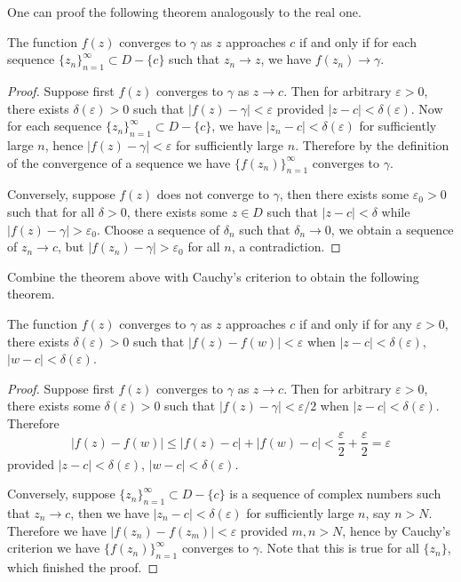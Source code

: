 One can proof the following theorem analogously to the real one.
\begin{theorem}
The function $f(z)$ converges to $\gamma$ as $z$ approaches $c$ if and only if for each sequence $\{z_n\}_{n=1}^\infty\subset D-\{c\}$ such that $z_n\to z$, we have $f(z_n)\to \gamma$.
\end{theorem}
\begin{proof}
Suppose first $f(z)$ converges to $\gamma$ as $z\to c$. Then for arbitrary $\varepsilon>0$, there exists $\delta(\varepsilon)>0$ such that $|f(z)-\gamma|<\varepsilon$ provided $|z-c|<\delta(\varepsilon)$. Now for each sequence $\{z_n\}_{n=1}^\infty\subset D-\{c\}$, we have $|z_n-c|<\delta(\varepsilon)$ for sufficiently large $n$, hence $|f(z)-\gamma|<\varepsilon$ for sufficiently large $n$. Therefore by the definition of the convergence of a sequence we have $\{f(z_n)\}_{n=1}^\infty$ converges to $\gamma$.\par
Conversely, suppose $f(z)$ does not converge to $\gamma$, then there exists some $\varepsilon_0>0$ such that for all $\delta>0$, there exists some $z\in D$ such that $|z-c|<\delta$ while $|f(z)-\gamma|>\varepsilon_0$. Choose a sequence of $\delta_n$ such that $\delta_n\to 0$, we obtain a sequence of $z_n\to c$, but $|f(z_n)-\gamma|>\varepsilon_0$ for all $n$, a contradiction.
\end{proof}
Combine the theorem above with Cauchy's criterion to obtain the following theorem.
\begin{theorem}
The function $f(z)$ converges to $\gamma$ as $z$ approaches $c$ if and only if for any $\varepsilon>0$, there exists $\delta(\varepsilon)>0$ such that $|f(z)-f(w)|<\varepsilon$ when $|z-c|<\delta(\varepsilon)$, $|w-c|<\delta(\varepsilon)$.
\end{theorem}
\begin{proof}
Suppose first $f(z)$ converges to $\gamma$ as $z\to c$. Then for arbitrary $\varepsilon>0$, there exists some $\delta(\varepsilon)>0$ such that $|f(z)-\gamma|<\varepsilon/2$ when $|z-c|<\delta(\varepsilon)$. Therefore 
$$
\left| f\left( z \right) -f\left( w \right) \right|\le \left| f\left( z \right) -c \right|+\left| f\left( w \right) -c \right|<\frac{\varepsilon}{2}+\frac{\varepsilon}{2}=\varepsilon 
$$
provided $|z-c|<\delta(\varepsilon)$, $|w-c|<\delta(\varepsilon)$.\par
Conversely, suppose $\{z_n\}_{n=1}^\infty\subset D-\{c\}$ is a sequence of complex numbers such that $z_n\to c$, then we have $|z_n-c|<\delta(\varepsilon)$ for sufficiently large $n$, say $n>N$. Therefore we have $|f(z_n)-f(z_m)|<\varepsilon$ provided $m,n>N$, hence by Cauchy's criterion we have $\{f(z_n)\}_{n=1}^\infty$ converges to $\gamma$. Note that this is true for all $\{z_n\}$, which finished the proof.
\end{proof}
